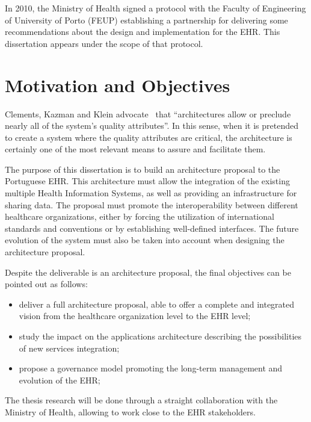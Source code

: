 In 2010, the Ministry of Health signed a protocol with the Faculty of Engineering of University of Porto (FEUP) establishing a partnership for delivering some recommendations about the design and implementation for the EHR. This dissertation appears under the scope of that protocol.

\section{Motivation and Objectives} \label{sec:goals}

Clements, Kazman and Klein advocate~\citep{Clements2001} that ``architectures allow or preclude nearly all of the system's quality attributes''. In this sense, when it is pretended to create a system where the quality attributes are critical, the architecture is certainly one of the most relevant means to assure and facilitate them.

The purpose of this dissertation is to build an architecture proposal to the Portuguese EHR. This architecture must allow the integration of the existing multiple Health Information Systems, as well as providing an infrastructure for sharing data. The proposal must promote the interoperability between different healthcare organizations, either by forcing the utilization of international standards and conventions or by establishing well-defined interfaces. The future evolution of the system must also be taken into account when designing the architecture proposal.

Despite the deliverable is an architecture proposal, the final objectives can be pointed out as follows:
\begin{itemize}
\item deliver a full architecture proposal, able to offer a complete and integrated vision from the healthcare organization level to the EHR level;
\item study the impact on the applications architecture describing the possibilities of new services integration;
\item propose a governance model promoting the long-term management and evolution of the EHR;
\end{itemize}

The thesis research will be done through a straight collaboration with the Ministry of Health, allowing to work close to the EHR stakeholders.

